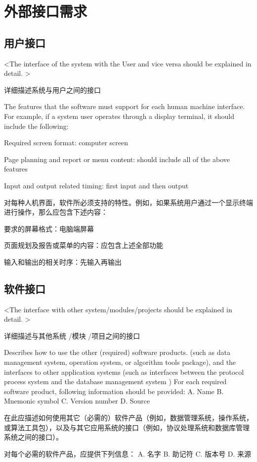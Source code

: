 \section{外部接口需求}
\subsection{用户接口}
<The interface of the system with the User and vice versa should be explained in detail. >

详细描述系统与用户之间的接口

The features that the software must support for each human machine interface. For example, if a system user operates through a display terminal, it should include the following:

Required screen format: computer screen

Page planning and report or menu content: should include all of the above features

Input and output related timing: first input and then output

对每种人机界面，软件所必须支持的特性。例如，如果系统用户通过一个显示终端进行操作，那么应包含下述内容：

要求的屏幕格式：电脑端屏幕

页面规划及报告或菜单的内容：应包含上述全部功能

输入和输出的相关时序：先输入再输出


\subsection{软件接口}
<The interface with other system/modules/projects should be explained in detail. >

详细描述与其他系统 /模块 /项目之间的接口

Describes how to use the other (required) software products. (such as data management system, operation system, or algorithm tools package), and the interfaces to other application systems (such as interfaces between the protocol process system and the database management system )
For each required software product, following information should be provided:
A. Name
B. Mnemonic symbol
C. Version number
D. Source

在此应描述如何使用其它（必需的）软件产品（例如，数据管理系统，操作系统，或算法工具包），以及与其它应用系统的接口（例如，协议处理系统和数据库管理系统之间的接口）。

对每个必需的软件产品，应提供下列信息：
A.	名字
B.	助记符
C.	版本号
D.	来源

